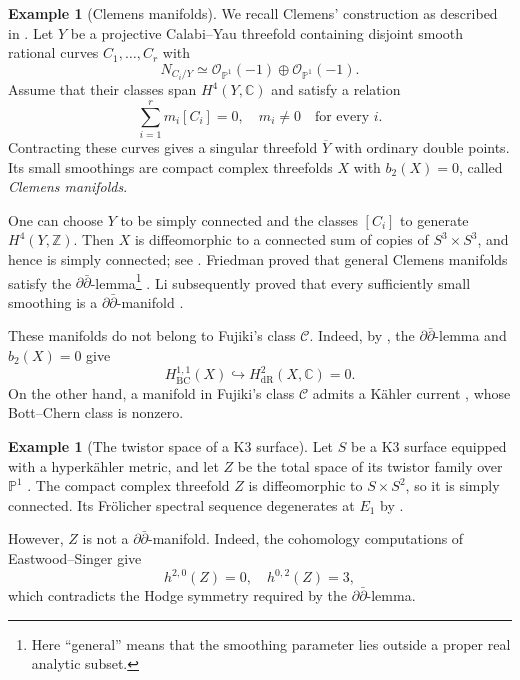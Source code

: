 \documentclass[11pt]{amsart}
\newcommand{\ddbar}{\partial\bar\partial}
\numberwithin{equation}{section}
\theoremstyle{definition}
\newtheorem{example}  [theorem]     {Example}
\theoremstyle{plain}
\theoremstyle{plain}
\theoremstyle{definition}
\theoremstyle{stepstyle}
\begin{document}
	\begin{example}[Clemens manifolds]\label{cle}
		We recall Clemens' construction as described in
		\cite[p.~1001]{Friedman}.
		Let $Y$ be a projective Calabi--Yau threefold containing
		disjoint smooth rational curves $C_1,\ldots,C_r$ with
		$$
		N_{C_i/Y}\simeq
		\mathcal O_{\mathbb P^1}(-1)\oplus\mathcal O_{\mathbb P^1}(-1).
		$$
		Assume that their classes span $H^4(Y,\mathbb C)$ and satisfy
		a relation
		$$
		\sum_{i=1}^r m_i[C_i]=0,
		\quad m_i\neq0\quad\text{for every }i.
		$$
		Contracting these curves gives a singular threefold
		$\overline Y$ with ordinary double points.
		Its small smoothings are compact complex threefolds $X$
		with $b_2(X)=0$, called \emph{Clemens manifolds}.
		
		One can choose $Y$ to be simply connected and the classes
		$[C_i]$ to generate $H^4(Y,\mathbb Z)$.
		Then $X$ is diffeomorphic to a connected sum of copies of
		$S^3\times S^3$, and hence is simply connected;
		see \cite[p.~1001]{Friedman}.
		Friedman proved that general Clemens manifolds satisfy the
		$\ddbar$-lemma\footnote{Here ``general'' means that the smoothing
			parameter lies outside a proper real analytic subset.}
		\cite[Corollary~3.8 \& Theorem~3.10]{Friedman}.
		Li subsequently proved that every sufficiently small
		smoothing is a $\ddbar$-manifold \cite{Li}.
		
		These manifolds do not belong to Fujiki's class $\mathcal C$.
		Indeed, by \cite[Lemma 5.15 \& Remark 5.16]{DGMS75}, the $\ddbar$-lemma and $b_2(X)=0$ give
		$$
		H^{1,1}_\textrm{BC}(X)\hookrightarrow
		H^2_{\mathrm{dR}}(X,\mathbb C)=0.
		$$
		On the other hand, a manifold in Fujiki's class $\mathcal C$
		admits a K\"ahler current \cite[Theorem~0.7]{DP},
		whose Bott--Chern class is nonzero.
	\end{example}
	
	\begin{example}[The twistor space of a K3 surface]\label{twistor}
			Let $S$ be a K3 surface equipped with a hyperk\"ahler metric,
			and let $Z$ be the total space of its twistor family over
			$\mathbb P^1$ \cite[\S3 (F)]{HKLR}.
			The compact complex threefold $Z$ is diffeomorphic to
			$S\times S^2$, so it is simply connected.
			Its Fr\"olicher spectral sequence degenerates at $E_1$
			by \cite[Corollary~5.2]{ES}.
			
			However, $Z$ is not a $\ddbar$-manifold.
			Indeed, the cohomology computations of Eastwood--Singer
			\cite{ES} give
			$$
			h^{2,0}(Z)=0,\quad h^{0,2}(Z)=3,
			$$
			which contradicts the Hodge symmetry required by the
			$\ddbar$-lemma.
	\end{example}
	
\end{document}
